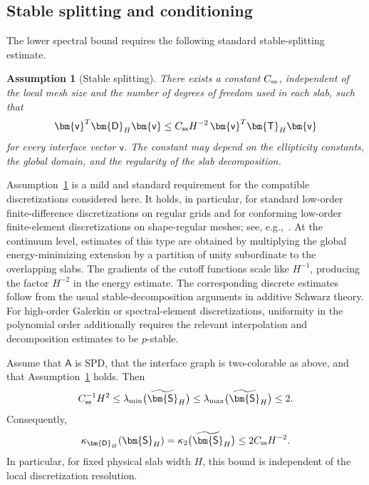 \documentclass[final,onefignum,onetabnum]{siamart250211}
\newcommand{\vct}[1]{\bm{\mathsf{#1}}}
\newcommand{\mtx}[1]{\bm{\mathsf{#1}}}
\newtheorem{assumption}[thm]{Assumption}
\theoremstyle{definition}
\begin{document}
\subsection{Stable splitting and conditioning}
The lower spectral bound requires the following standard stable-splitting estimate.

\begin{assumption}[Stable splitting]
\label{ass:stable_decomposition}
There exists a constant $C_{\rm ss}$, independent of the local mesh size and the number of degrees of freedom used in each slab, such that
\begin{equation}
  \vct{v}^T\mtx{D}_H\vct{v}
  \le C_{\rm ss}H^{-2}\,
       \vct{v}^T\mtx{T}_H\vct{v}
  \label{eq:stable_decomp_assumption}
\end{equation}
for every interface vector $\vct{v}$.  The constant may depend on the ellipticity constants, the global domain, and the regularity of the slab decomposition.
\end{assumption}

Assumption~\ref{ass:stable_decomposition} is a mild and standard requirement for the compatible discretizations considered here.  It holds, in particular, for standard low-order finite-difference discretizations on regular grids and for conforming low-order finite-element discretizations on shape-regular meshes; see, e.g.,~\cite{smithDD,toselliWidlundDD}.  At the continuum level, estimates of this type are obtained by multiplying the global energy-minimizing extension by a partition of unity subordinate to the overlapping slabs.  The gradients of the cutoff functions scale like $H^{-1}$, producing the factor $H^{-2}$ in the energy estimate.  The corresponding discrete estimates follow from the usual stable-decomposition arguments in additive Schwarz theory.  For high-order Galerkin or spectral-element discretizations, uniformity in the polynomial order additionally requires the relevant interpolation and decomposition estimates to be $p$-stable.

\begin{theorem}
\label{thm:condDisc}
Assume that $\mtx{A}$ is SPD, that the interface graph is two-colorable as above, and that Assumption~\ref{ass:stable_decomposition} holds.  Then
\begin{equation}
  C_{\rm ss}^{-1}H^2
  \le
  \lambda_{\min}\bigl(\widetilde{\mtx{S}}_H\bigr)
  \le
  \lambda_{\max}\bigl(\widetilde{\mtx{S}}_H\bigr)
  \le 2.
  \label{eq:scaled_eigenvalue_bounds}
\end{equation}
Consequently,
\begin{equation}
  \kappa_{\mtx{D}_H}(\mtx{S}_H)
  =\kappa_2\bigl(\widetilde{\mtx{S}}_H\bigr)
  \le 2C_{\rm ss}H^{-2}.
  \label{eq:condition_bound}
\end{equation}
In particular, for fixed physical slab width $H$, this bound is independent of the local discretization resolution.
\end{theorem}
\end{document}
